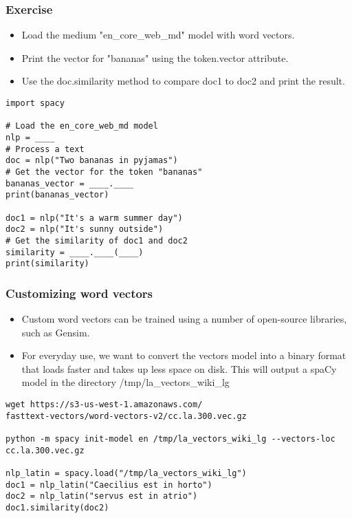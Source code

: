\begin{frame}[fragile]\frametitle{Exercise}

\begin{itemize}
\item Load the medium "en\_core\_web\_md" model with word vectors.
\item Print the vector for "bananas" using the token.vector attribute.
\item Use the doc.similarity method to compare doc1 to doc2 and print the result.

\end{itemize}


\begin{lstlisting}
import spacy

# Load the en_core_web_md model
nlp = ____
# Process a text
doc = nlp("Two bananas in pyjamas")
# Get the vector for the token "bananas"
bananas_vector = ____.____
print(bananas_vector)

doc1 = nlp("It's a warm summer day")
doc2 = nlp("It's sunny outside")
# Get the similarity of doc1 and doc2
similarity = ____.____(____)
print(similarity)
\end{lstlisting}


\end{frame}


\begin{frame}[fragile]\frametitle{Customizing word vectors}

\begin{itemize}
\item Custom word vectors can be trained using a number of open-source libraries, such as Gensim.
\item For everyday use, we want to convert the vectors model into a binary format that loads faster and takes up less space on disk.
This will output a spaCy model in the directory /tmp/la\_vectors\_wiki\_lg
\end{itemize}

\begin{lstlisting}
wget https://s3-us-west-1.amazonaws.com/
fasttext-vectors/word-vectors-v2/cc.la.300.vec.gz

python -m spacy init-model en /tmp/la_vectors_wiki_lg --vectors-loc cc.la.300.vec.gz

nlp_latin = spacy.load("/tmp/la_vectors_wiki_lg")
doc1 = nlp_latin("Caecilius est in horto")
doc2 = nlp_latin("servus est in atrio")
doc1.similarity(doc2)
\end{lstlisting}


\end{frame}

